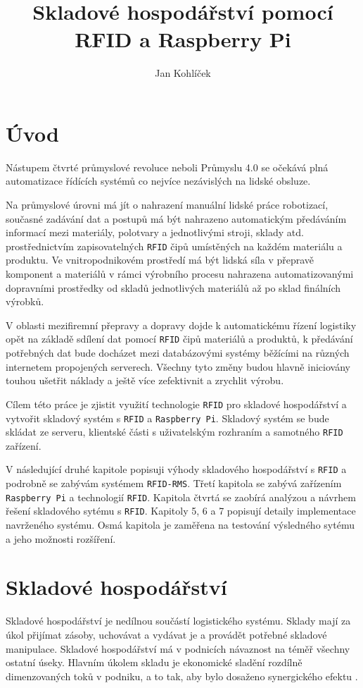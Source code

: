 \documentclass[czech,BP]{thesiskiv}
\author{Jan Kohlíček}
\title{Skladové hospodářství pomocí RFID a Raspberry Pi}
\begin{document}
\maketitle
\tableofcontents


\chapter{Úvod}
Nástupem čtvrté průmyslové revoluce neboli Průmyslu 4.0 se očekává plná automatizace řídících systémů co nejvíce nezávislých na lidské obsluze.

Na průmyslové úrovni má jít o nahrazení manuální lidské práce robotizací, současné  zadávání dat a postupů má být nahrazeno automatickým předáváním informací mezi materiály, polotvary a jednotlivými stroji, sklady atd. prostřednictvím zapisovatelných \texttt{RFID} čipů umístěných na každém materiálu a produktu. Ve vnitropodnikovém prostředí má být lidská síla v přepravě komponent a materiálů v rámci výrobního procesu nahrazena automatizovanými dopravními prostředky od skladů jednotlivých materiálů až po sklad finálních výrobků.

V oblasti mezifiremní přepravy a dopravy dojde k automatickému řízení logistiky opět na základě sdílení dat pomocí \texttt{RFID} čipů materiálů a produktů, k předávání potřebných dat bude docházet mezi databázovými systémy běžícími na různých internetem propojených serverech. Všechny tyto změny budou hlavně iniciovány touhou ušetřit náklady a ještě více zefektivnit a zrychlit výrobu.

Cílem této práce je zjistit využití technologie \texttt{RFID} pro skladové hospodářství a vytvořit skladový systém s \texttt{RFID} a \texttt{Raspberry Pi}.
Skladový systém se bude skládat ze serveru, klientské části s uživatelským rozhraním a samotného \texttt{RFID} zařízení.

V následující druhé kapitole popisuji výhody skladového hospodářství s \texttt{RFID} a podrobně se zabývám systémem \texttt{RFID-RMS}. Třetí kapitola se zabývá zařízením \texttt{Raspberry Pi} a technologií \texttt{RFID}. Kapitola čtvrtá se zaobírá analýzou a návrhem řešení skladového sytému s \texttt{RFID}. Kapitoly 5, 6 a 7 popisují detaily implementace navrženého systému. Osmá kapitola je zaměřena na testování výsledného sytému a jeho možnosti rozšíření.

\chapter{Skladové hospodářství}
Skladové hospodářství je nedílnou součástí logistického systému. Sklady mají za úkol přijímat zásoby, uchovávat a vydávat je a provádět potřebné skladové manipulace. Skladové hospodářství má v podnicích návaznost na téměř všechny ostatní úseky. Hlavním úkolem skladu je ekonomické sladění rozdílně dimenzovaných toků v podniku, a to tak, aby bylo dosaženo synergického efektu \cite{vitek2007skladove}.
\end{document}
